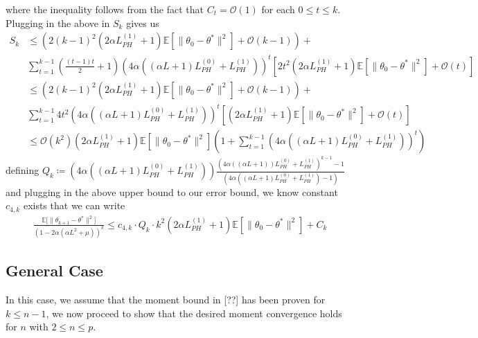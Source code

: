 \documentclass[a4paper]{article}
\newcommand{\norm}[1]{\|#1 \|}
\newcommand{\Exs}{\mathbb{E}}
\newcommand{\thetastar}{\theta^*}
\newcommand{\constLPH}[1]{L_{PH}^{(#1)}}
\newcommand{\stepsize}{\alpha}
\begin{document}
where the inequality follows from the fact that $C_{t} = \mathcal{O}(1)$ for each $0 \le t \le k$. Plugging in the above in $S_{k}$ gives us
\begin{align*}
	S_{k} & \le \left(2(k - 1)^{2}\left(2\stepsize\constLPH{1} + 1\right)\Exs\left[\norm{\theta_{0} - \thetastar}^{2}\right] + \mathcal{O}\left(k - 1\right)\right) +\\
	& \sum_{t = 1}^{k - 1}\left(\frac{(t - 1)t}{2} + 1\right)\left(4\stepsize\left(\left(\stepsize L + 1\right)\constLPH{0} + \constLPH{1}\right)\right)^{t}\left[2t^{2}\left(2\stepsize\constLPH{1} + 1\right)\Exs\left[\norm{\theta_{0} - \thetastar}^{2}\right] + \mathcal{O}\left(t\right)\right]\\
	& \le \left(2(k - 1)^{2}\left(2\stepsize\constLPH{1} + 1\right)\Exs\left[\norm{\theta_{0} - \thetastar}^{2}\right] + \mathcal{O}\left(k - 1\right)\right) +\\
	&  \sum_{t = 1}^{k - 1}4t^{2}\left(4\stepsize\left(\left(\stepsize L + 1\right)\constLPH{0} + \constLPH{1}\right)\right)^{t}\left[\left(2\stepsize\constLPH{1} + 1\right)\Exs\left[\norm{\theta_{0} - \thetastar}^{2}\right] + \mathcal{O}\left(t\right)\right]\\
	& \le \mathcal{O}\left(k^{2}\right)\left(2\stepsize\constLPH{1} + 1\right)\Exs\left[\norm{\theta_{0} - \thetastar}^{2}\right]\left(1 + \sum_{t = 1}^{k - 1}\left(4\stepsize\left(\left(\stepsize L + 1\right)\constLPH{0} + \constLPH{1}\right)\right)^{t}\right)
\end{align*} 
 defining $Q_{k} \coloneq \left(4\stepsize\left(\left(\stepsize L + 1\right)\constLPH{0} + \constLPH{1}\right)\right)\frac{\left(4\stepsize\left(\left(\stepsize L + 1\right)\right)\constLPH{0} + \constLPH{1}\right)^{k - 1} - 1}{\left(4\stepsize\left(\left(\stepsize L + 1\right)\constLPH{0} + \constLPH{1}\right) - 1\right)}$ and plugging in the above upper bound to our error bound, we know constant $c_{4, k}$ exists that we can write
 \begin{align*}
 	\frac{\Exs \big[ \norm{\theta_{k + 1} - \thetastar}^2 \big]}{(1 - 2 \stepsize (\stepsize L^2 + \mu))^k} \le c_{4, k} \cdot Q_{k} \cdot k^{2} \left(2\stepsize\constLPH{1} + 1\right)\Exs\left[\norm{\theta_{0} - \thetastar}^{2}\right] + C_{k}
 \end{align*}
 
\subsection{General Case}
In this case, we assume that the moment bound in [??] has been proven for $k \le n - 1$, we now proceed to show that the desired moment convergence holds for $n$ with $2 \le n \le p$.
\end{document}
